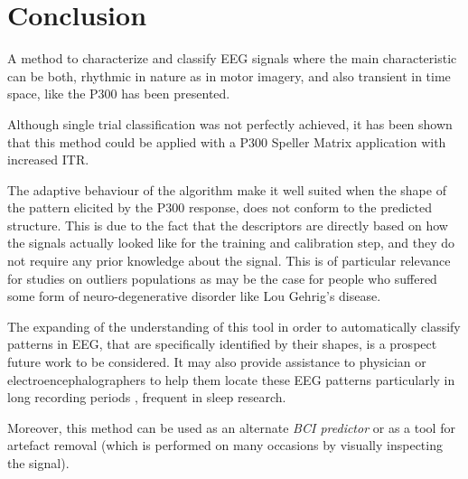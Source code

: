 \documentclass[entropy,article,submit,moreauthors,pdftex,10pt,a4paper]{mdpi}
\begin{document}
\section{Conclusion}

A method to characterize and classify EEG signals where the main characteristic can be both, rhythmic in nature as in motor imagery, and also transient in time space, like the P300 has been presented.

Although single trial classification was not perfectly achieved, it has been shown that this method could be applied with a P300 Speller Matrix application with increased ITR.


The adaptive behaviour of the algorithm make it well suited when the shape of the pattern elicited by the P300 response, does not conform to the predicted structure.  This is due to the fact that the descriptors are directly based on how the signals actually looked like for the training and calibration step, and they do not require any prior knowledge about the signal.  This is of particular relevance for studies on outliers populations as may be the case for people who suffered some form of neuro-degenerative disorder like Lou Gehrig's disease.

The expanding of the understanding of this tool in order to automatically classify patterns in EEG, that are specifically identified by their shapes, is a prospect future work to be considered.  It may also provide  assistance to physician or electroencephalographers to help them locate these EEG patterns particularly in long recording periods \citep{Hartman2005}, frequent in sleep research.

Moreover, this method can be used as an alternate \textit{BCI predictor} \citep{Clerc} or as a tool for artefact removal (which is performed on many occasions by visually inspecting the signal).
\end{document}
